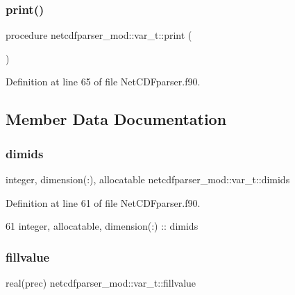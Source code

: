 \subsubsection{\texorpdfstring{print()}{print()}}
{\footnotesize\ttfamily procedure netcdfparser\+\_\+mod\+::var\+\_\+t\+::print (\begin{DoxyParamCaption}{ }\end{DoxyParamCaption})\hspace{0.3cm}{\ttfamily [private]}}



Definition at line 65 of file Net\+C\+D\+Fparser.\+f90.



\subsection{Member Data Documentation}
\mbox{\label{structnetcdfparser__mod_1_1var__t_a1bb991339dd3410a02d8e36a70672e61}} 
\subsubsection{\texorpdfstring{dimids}{dimids}}
{\footnotesize\ttfamily integer, dimension(\+:), allocatable netcdfparser\+\_\+mod\+::var\+\_\+t\+::dimids\hspace{0.3cm}{\ttfamily [private]}}



Definition at line 61 of file Net\+C\+D\+Fparser.\+f90.


\begin{DoxyCode}
61         \textcolor{keywordtype}{integer}, \textcolor{keywordtype}{allocatable}, \textcolor{keywordtype}{dimension(:)} :: dimids
\end{DoxyCode}
\mbox{\label{structnetcdfparser__mod_1_1var__t_a8e89e092236a61f096a44ad123d4d35e}} 
\subsubsection{\texorpdfstring{fillvalue}{fillvalue}}
{\footnotesize\ttfamily real(prec) netcdfparser\+\_\+mod\+::var\+\_\+t\+::fillvalue\hspace{0.3cm}{\ttfamily [private]}}



